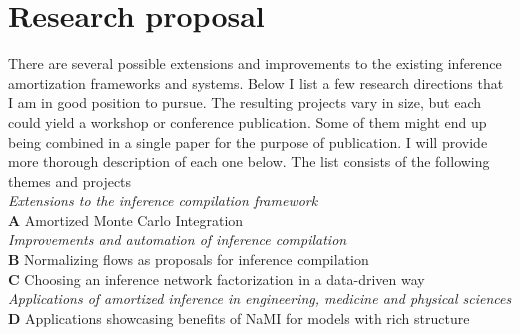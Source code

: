 \documentclass[12pt]{article}
\begin{document}
% 
% 



\section{Research proposal}
There are several possible extensions and improvements to the existing inference amortization frameworks and systems. 
Below I list a few research directions that I am in good position to pursue.
The resulting projects vary in size, but each could yield a workshop or conference publication.
Some of them might end up being combined in a single paper for the purpose of publication.
I will provide more thorough description of each one below.
The list consists of the following themes and projects\\
\emph{Extensions to the inference compilation framework}\\
\textbf{A} \quad Amortized Monte Carlo Integration\\
\emph{Improvements and automation of inference compilation}\\
\textbf{B} \quad Normalizing flows as proposals for inference compilation\\
\textbf{C} \quad Choosing an inference network factorization in a data-driven way\\
\emph{Applications of amortized inference in engineering, medicine and physical sciences}\\
\textbf{D} \quad Applications showcasing benefits of NaMI for models with rich structure\\
\end{document}
